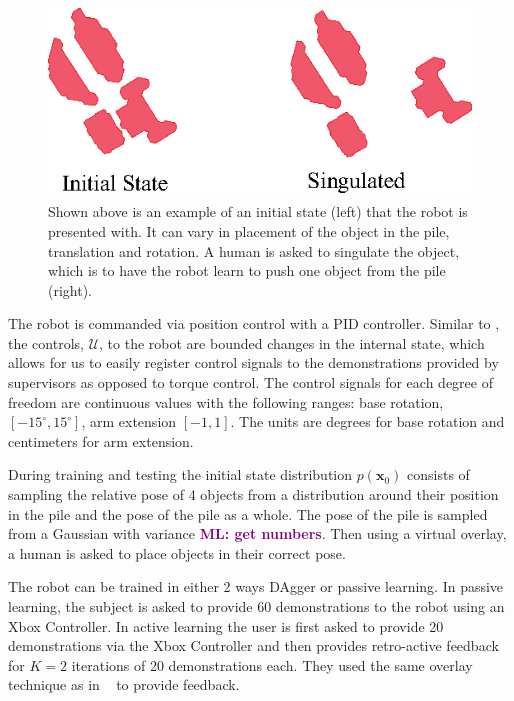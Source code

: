 \documentclass[10pt, conference]{ieeeconf}      %
\newcommand{\bx}{\mathbf{x}}
\newcommand{\mlnote}[1]{\ifthenelse{ \boolean{include-notes}}%
 {\textcolor{purple}{\textbf{ML: #1}}}{}}
\begin{document}
\begin{figure}
\centering
\includegraphics{f_figs/singulation.eps}
\caption{
    \footnotesize
Shown above is an example of an initial state (left) that the robot is presented with. It can vary in placement of the object in the pile, translation and rotation. A human is asked to singulate the object, which is to have the robot learn to push one object from the pile (right).  }

\label{fig:izzy_rw}
\end{figure}

The robot is commanded via position 
control with a  PID controller. Similar to \cite{laskeyshiv}, the controls, $\mathcal{U}$, to the robot are bounded changes in the internal state, which allows for us to easily register control signals to the demonstrations provided by supervisors as opposed to torque control. The control signals for each degree of freedom are continuous values with the following ranges: base rotation, $[-15^\circ,15^\circ]$, arm extension $[-1,1]$. The units are degrees for base rotation and centimeters for arm extension. 

During training and testing the initial state distribution $p(\bx_0)$ consists of sampling the relative pose of 4 objects from a distribution around their position in the pile and the pose of the pile as a whole. The pose of the pile is sampled from a Gaussian with variance \mlnote{get numbers}. Then using a virtual overlay,  a human is asked to place objects in their correct pose. 

The robot can be trained in either 2 ways DAgger or passive learning. In passive learning, the subject is asked to provide 60 demonstrations to the robot using an Xbox Controller. In active learning the user is first asked to provide 20 demonstrations via the Xbox Controller and then provides retro-active feedback for $K=2$ iterations of 20 demonstrations each. They used the same overlay technique as in ~\cite{laskeyrobot} to provide feedback. 
\end{document}
